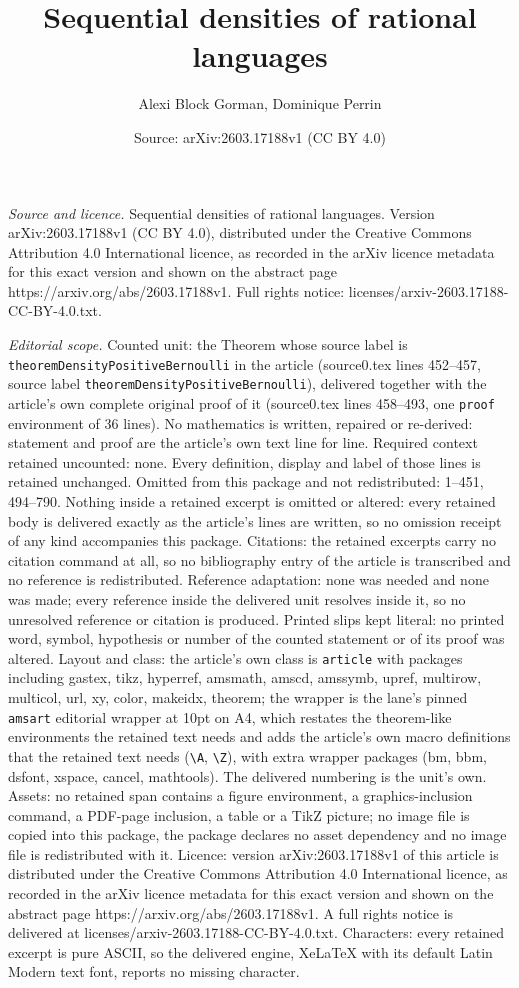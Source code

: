 \documentclass[10pt,a4paper]{amsart}
\title[Sequential densities of rational languages]{Sequential densities of rational languages}
\author{Alexi Block Gorman, Dominique Perrin}
\date{Source: arXiv:2603.17188v1 (CC BY 4.0)}
\begin{document}
\maketitle

\noindent\emph{Source and licence.} Sequential densities of rational languages. Version arXiv:2603.17188v1 (CC BY 4.0), distributed under the Creative Commons Attribution 4.0 International licence, as recorded in the arXiv licence metadata for this exact version and shown on the abstract page https://arxiv.org/abs/2603.17188v1. Full rights notice: licenses/arxiv-2603.17188-CC-BY-4.0.txt.\par\smallskip

\noindent\textit{Editorial scope.} Counted unit: the Theorem whose source label is \texttt{theoremDensityPositiveBernoulli} in the article (source0.tex lines 452--457, source label \texttt{theoremDensityPositiveBernoulli}), delivered together with the article's own complete original proof of it (source0.tex lines 458--493, one \texttt{proof} environment of 36 lines). No mathematics is written, repaired or re-derived: statement and proof are the article's own text line for line. Required context retained uncounted: none. Every definition, display and label of those lines is retained unchanged. Omitted from this package and not redistributed: 1--451, 494--790. Nothing inside a retained excerpt is omitted or altered: every retained body is delivered exactly as the article's lines are written, so no omission receipt of any kind accompanies this package. Citations: the retained excerpts carry no citation command at all, so no bibliography entry of the article is transcribed and no reference is redistributed. Reference adaptation: none was needed and none was made; every reference inside the delivered unit resolves inside it, so no unresolved reference or citation is produced. Printed slips kept literal: no printed word, symbol, hypothesis or number of the counted statement or of its proof was altered. Layout and class: the article's own class is \texttt{article} with packages including gastex, tikz, hyperref, amsmath, amscd, amssymb, upref, multirow, multicol, url, xy, color, makeidx, theorem; the wrapper is the lane's pinned \texttt{amsart} editorial wrapper at 10pt on A4, which restates the theorem-like environments the retained text needs and adds the article's own macro definitions that the retained text needs (\texttt{\textbackslash A}, \texttt{\textbackslash Z}), with extra wrapper packages (bm, bbm, dsfont, xspace, cancel, mathtools). The delivered numbering is the unit's own. Assets: no retained span contains a figure environment, a graphics-inclusion command, a PDF-page inclusion, a table or a TikZ picture; no image file is copied into this package, the package declares no asset dependency and no image file is redistributed with it. Licence: version arXiv:2603.17188v1 of this article is distributed under the Creative Commons Attribution 4.0 International licence, as recorded in the arXiv licence metadata for this exact version and shown on the abstract page https://arxiv.org/abs/2603.17188v1. A full rights notice is delivered at licenses/arxiv-2603.17188-CC-BY-4.0.txt. Characters: every retained excerpt is pure ASCII, so the delivered engine, XeLaTeX with its default Latin Modern text font, reports no missing character.
\end{document}
